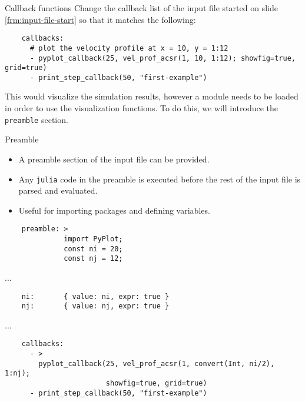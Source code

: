 \documentclass[pdf]{beamer}
\begin{document}
\begin{frame}[fragile]{Callback functions}
  Change the callback list of the input file started on slide \ref{frm:input-file-start} so that it matches the following:
  {\tiny
  \begin{verbatim}
    callbacks:
      # plot the velocity profile at x = 10, y = 1:12
      - pyplot_callback(25, vel_prof_acsr(1, 10, 1:12); showfig=true, grid=true)
      - print_step_callback(50, "first-example")
  \end{verbatim} 
  }
  This would visualize the simulation results, however a module needs to be loaded in order to use the visualization functions.
  To do this, we will introduce the \texttt{preamble} section.
\end{frame}

\begin{frame}[fragile]{Preamble}
  \begin{itemize}
    \item A preamble section of the input file can be provided.
    \item Any \texttt{julia} code in the preamble is executed before the rest of the input file is parsed and evaluated.
    \item Useful for importing packages and defining variables.
  \end{itemize}
  \tiny
  \begin{verbatim}
    preamble: >
              import PyPlot; 
              const ni = 20;
              const nj = 12;
  \end{verbatim}
  ...
  \begin{verbatim}
    ni:       { value: ni, expr: true }
    nj:       { value: nj, expr: true }
  \end{verbatim}
  ...
  \begin{verbatim}
    callbacks:
      - >
        pyplot_callback(25, vel_prof_acsr(1, convert(Int, ni/2), 1:nj); 
                        showfig=true, grid=true)
      - print_step_callback(50, "first-example")
  \end{verbatim}
\end{frame}
\end{document}
